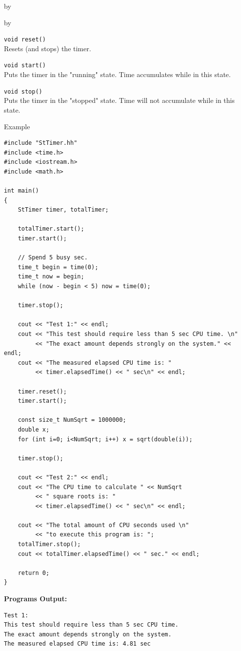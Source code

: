 \documentclass[twoside]{article}
\newcommand{\entrylabel}[1]{\mbox{\textbf{{#1}}}\hfil}%
\newenvironment{entry}
{\begin{list}{}%
    {\renewcommand{\makelabel}{\entrylabel}%
     \setlength{\labelwidth}{90pt}%
     \setlength{\leftmargin}{\labelwidth}
     \advance\leftmargin by \labelsep%
      }%
    }%
  {\end{list}}
\newcommand{\Entrylabel}[1]%
{\raisebox{0pt}[1ex][0pt]{\makebox[\labelwidth][l]%
    {\parbox[t]{\labelwidth}{\hspace{0pt}\textbf{{#1}}}}}}
\newenvironment{Entry}%
{\renewcommand{\entrylabel}{\Entrylabel}\begin{entry}}%
  {\end{entry}}
\begin{document}
\begin{description}
\begin{Entry}
\begin{Entry}
    \verb+void reset()+\\
    Resets (and stops) the timer.
 
    \verb+void start()+\\
    Puts the timer in the "running" state. Time accumulates while
    in this state.

    \verb+void stop()+\\
    Puts the timer in the "stopped" state. Time will not accumulate
    while in this state.

\item[Example]
{\footnotesize
\begin{verbatim}
#include "StTimer.hh"
#include <time.h>
#include <iostream.h>
#include <math.h>

int main()
{   
    StTimer timer, totalTimer;
    
    totalTimer.start();
    timer.start();
    
    // Spend 5 busy sec.
    time_t begin = time(0);
    time_t now = begin;
    while (now - begin < 5) now = time(0);
    
    timer.stop();
    
    cout << "Test 1:" << endl;
    cout << "This test should require less than 5 sec CPU time. \n"
         << "The exact amount depends strongly on the system." << endl;
    cout << "The measured elapsed CPU time is: "
         << timer.elapsedTime() << " sec\n" << endl;
    
    timer.reset();
    timer.start();
    
    const size_t NumSqrt = 1000000;
    double x;
    for (int i=0; i<NumSqrt; i++) x = sqrt(double(i));
    
    timer.stop();
    
    cout << "Test 2:" << endl;
    cout << "The CPU time to calculate " << NumSqrt
         << " square roots is: "
         << timer.elapsedTime() << " sec\n" << endl;
    
    cout << "The total amount of CPU seconds used \n"
         << "to execute this program is: ";
    totalTimer.stop();
    cout << totalTimer.elapsedTime() << " sec." << endl;
    
    return 0;
}
\end{verbatim}

{\bf Programs Output:}

\begin{verbatim}
Test 1:
This test should require less than 5 sec CPU time. 
The exact amount depends strongly on the system.
The measured elapsed CPU time is: 4.81 sec


\end{verbatim}}
\end{Entry}
\end{Entry}
\end{description}
\end{document}
